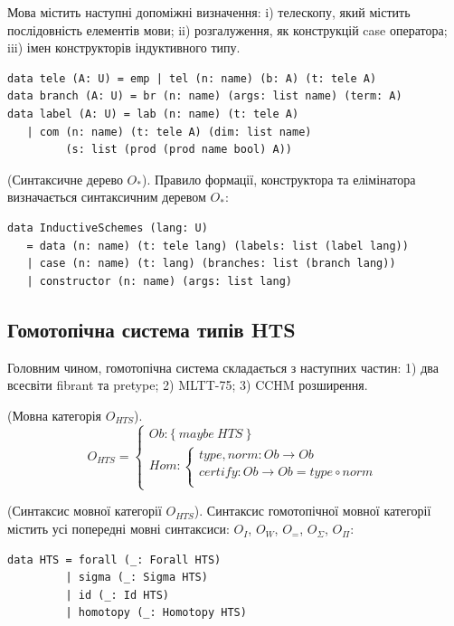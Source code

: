 Мова містить наступні допоміжні визначення: i) телескопу,
який містить послідовність елементів мови; ii) розгалуження,
як конструкцій case оператора; iii) імен конструкторів індуктивного типу.

\begin{lstlisting}
data tele (A: U) = emp | tel (n: name) (b: A) (t: tele A)
data branch (A: U) = br (n: name) (args: list name) (term: A)
data label (A: U) = lab (n: name) (t: tele A)
   | com (n: name) (t: tele A) (dim: list name)
         (s: list (prod (prod name bool) A))
\end{lstlisting}

\begin{definition} (Синтаксичне дерево $O_{*}$).
Правило формації, конструктора та елімінатора визначається синтаксичним деревом $O_{*}$:
\begin{lstlisting}
data InductiveSchemes (lang: U)
   = data (n: name) (t: tele lang) (labels: list (label lang))
   | case (n: name) (t: lang) (branches: list (branch lang))
   | constructor (n: name) (args: list lang)
\end{lstlisting}
\end{definition}

\newpage
\subsection{Гомотопічна система типів HTS}

Головним чином, гомотопічна система складається з наступних частин:
1) два всесвіти fibrant та pretype;
2) MLTT-75;
3) CCHM розширення.

\begin{definition} (Мовна категорія $O_{HTS}$).
$$
O_{HTS} =
\begin{cases}
Ob: \{\ maybe\ HTS\ \} \\
Hom: \begin{cases}
type,norm: Ob \rightarrow Ob \\
certify: Ob \rightarrow Ob = type \circ norm \\
\end{cases}
\end{cases}
$$
\end{definition}

\begin{definition} (Синтаксис мовної категорії $O_{HTS}$).
Синтаксис гомотопічної мовної категорії містить усі
попередні мовні синтаксиси: $O_I$, $O_W$, $O_=$, $O_\Sigma$, $O_\Pi$:
\begin{lstlisting}
data HTS = forall (_: Forall HTS)
         | sigma (_: Sigma HTS)
         | id (_: Id HTS)
         | homotopy (_: Homotopy HTS)
\end{lstlisting}
\end{definition}

